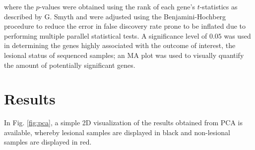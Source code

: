 \documentclass[journal, a4paper]{IEEEtran}
\begin{document}
\noindent where the $p$-values were obtained using the rank of each gene's $t$-statistics as described by G. Smyth and were adjusted using the Benjamini-Hochberg procedure to reduce the error in false discovery rate prone to be inflated due to performing multiple parallel statistical tests\cite{smyth2004linear, benjamini2010discovering}. A significance level of $0.05$ was used in determining the genes highly associated with the outcome of interest, the lesional status of sequenced samples; an MA plot was used to visually quantify the amount of potentially significant genes.\\



\section{Results}

In Fig. \ref{fig:pca}, a simple 2D visualization of the results obtained from PCA is available, whereby lesional samples are displayed in black and non-lesional samples are displayed in red.
\end{document}
